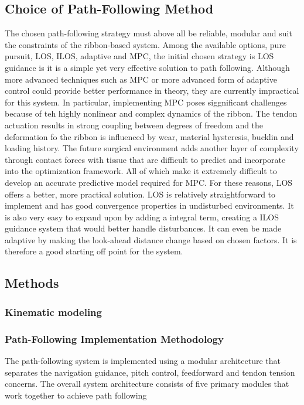 \subsection{Choice of Path-Following Method}
The chosen path-following strategy must above all be reliable, modular and suit the constraints of the ribbon-based system. Among the available options, pure pursuit, LOS, ILOS, adaptive and MPC, the initial chosen strategy is LOS guidance is it is a simple yet very effective solution to path following.
\newline \newline 
Although more advanced techniques such as MPC or more advanced form of adaptive control could provide better performance in theory, they are currently impractical for this system. In particular, implementing MPC poses siggnificant challenges because of teh highly nonlinear and complex dynamics of the ribbon. The tendon actuation results in strong coupling between degrees of freedom and the deformation fo the ribbon is influenced by wear, material hysteresis, bucklin and loading history. The future surgical environment adds another layer of complexity through contact forces with tissue that are difficult to predict and incorporate into the optimization framework. All of which make it extremely difficult to develop an accurate predictive model required for MPC.
\newline \newline
For these reasons, LOS offers a better, more practical solution. LOS is relatively straightforward to implement and has good convergence properties in undisturbed environments. It is also very easy to expand upon by adding a integral term, creating a ILOS guidance system that would better handle disturbances. It can even be made adaptive by making the look-ahead distance change based on chosen factors. It is therefore a good starting off point for the system.


\subsection{Methods}

\subsubsection{Kinematic modeling}



\subsubsection{Path-Following Implementation Methodology}
The path-following system is implemented using a modular architecture that separates the navigation guidance, pitch control, feedforward and tendon tension concerns. The overall system architecture consists of five primary modules that work together to achieve path following 

